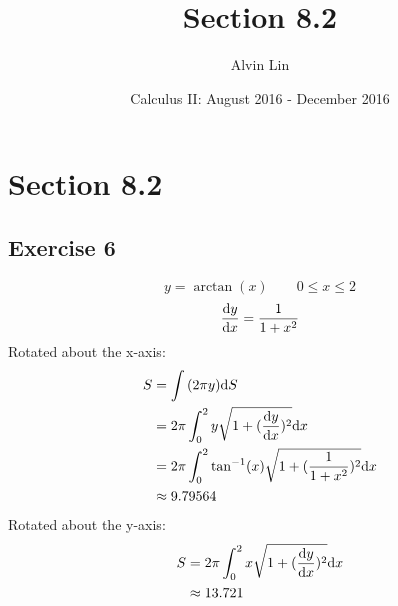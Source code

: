 \documentclass[letterpaper, 12pt]{math}
\title{Section 8.2}
\author{Alvin Lin}
\date{Calculus II: August 2016 - December 2016}
\begin{document}
\maketitle

\section*{Section 8.2}

\subsection*{Exercise 6}
\[ y = \arctan(x) \quad \quad 0 \leq x \leq 2 \]
\[ \frac{\mathrm{d}{y}}{\mathrm{d}{x}} = \frac{1}{1+x^{2}} \]
Rotated about the x-axis:
\begin{align*}
  S &= \int{(2\pi y)\mathrm{d}{S}} \\
  &= 2\pi\int_{0}^{2}{y\sqrt{1+(\frac{\mathrm{d}{y}}{\mathrm{d}{x}})^{2}}\mathrm{d}{x}} \\
  &= 2\pi\int_{0}^{2}{\tan^{-1}(x)\sqrt{1+(\frac{1}{1+x^{2}})^{2}}\mathrm{d}{x}} \\
  & \approx 9.79564
\end{align*}
Rotated about the y-axis:
\begin{align*}
  S &= 2\pi\int_{0}^{2}{x\sqrt{1+(\frac{\mathrm{d}{y}}{\mathrm{d}{x}})^{2}}\mathrm{d}{x}} \\
  & \approx 13.721
\end{align*}
\end{document}
